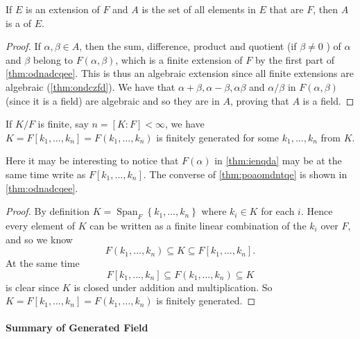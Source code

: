 \documentclass{article}
\begin{document}
\begin{cora}\label{cor:davcz}
If $E$ is an extension of $F$ and $A$ is the set of all elements in $E$ that are  $F$, then $A$ is a  of $E$.
\end{cora}
\begin{proof}
If $\alpha, \beta \in A$, then the sum, difference, product and quotient (if $\beta \neq 0$ ) of $\alpha$ and $\beta$ belong to $F(\alpha, \beta)$, which is a finite extension of $F$ by the first part of \cref{thm:odnadcqee}. This is thus an algebraic extension since all finite extensions are algebraic (\cref{thm:ondczfd}). We have that $\alpha+\beta, \alpha-\beta, \alpha \beta$ and $\alpha / \beta$ in $F(\alpha, \beta)$ (since it is a field) are algebraic and so they are in $A$, proving that $A$ is a field.
\end{proof}

\begin{thmx}\label{thm:poaomdntqe}
If $K / F$ is finite, say $n=[K: F]<\infty$, we have $K=F\left[k_{1}, \ldots, k_{n}\right]=F\left(k_{1}, \ldots, k_{n}\right)$ is finitely generated for some $k_1,\ldots,k_n$ from $K$.
\end{thmx}
\begin{remx}
Here it may be interesting to notice that $F(\alpha)$  in \cref{thm:ienqda} may be at the same time write as $F\left[k_{1}, \ldots, k_{n}\right]$. The converse of \cref{thm:poaomdntqe} is shown in \cref{thm:odnadcqee}.
\end{remx}



\begin{proof}
By definition $K=\operatorname{Span}_{F}\left\{k_{1}, \ldots, k_{n}\right\}$ where $k_{i} \in K$ for each $i$. Hence every element of $K$ can be written as a finite linear combination of the $k_{i}$ over $F$, and so we know $$F\left(k_{1}, \ldots, k_{n}\right) \subseteq K \subseteq F\left[k_{1}, \ldots, k_{n}\right].$$ At the same time $$F\left[k_{1}, \ldots, k_{n}\right] \subseteq F\left(k_{1}, \ldots, k_{n}\right) \subseteq K$$ is clear since $K$ is closed under addition and multiplication. So $K=F\left[k_{1}, \ldots, k_{n}\right]=F\left(k_{1}, \ldots, k_{n}\right)$ is finitely generated.
\end{proof}
\newpage
\paragraph{Summary of Generated Field}\label{sec.ad}
\end{document}
